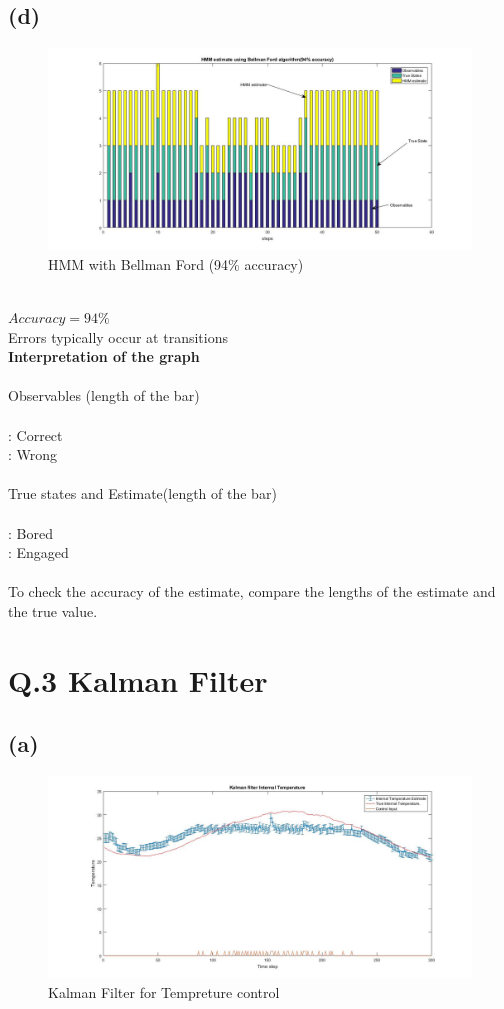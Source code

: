\documentclass[a4paper,11pt]{article}
\begin{document}
\subsection*{(d)}
\begin{figure}[h]
  \hspace*{-5cm}
   \includegraphics[scale=0.45]{q2_d}
   \caption{HMM with Bellman Ford (94\% accuracy)}\label{fig:q2_d}
\end{figure}
\quad \\
$Accuracy = 94\%$\\
Errors typically occur at transitions\\
\textbf{Interpretation of the graph}\\\\
Observables (length of the bar)\\\\
: Correct\\
: Wrong\\\\
True states and Estimate(length of the bar)\\\\
: Bored\\
: Engaged\\\\
To check the accuracy of the estimate, compare the lengths of the estimate and the true value.
\clearpage
\newpage
\section*{Q.3 Kalman Filter}
\subsection*{(a)}

\begin{figure}[h]
  \hspace*{-5cm}
   \includegraphics[scale=0.45]{q3_a}
   \caption{Kalman Filter for Tempreture control}\label{fig:q3}
\end{figure}
\clearpage
\newpage
\end{document}
